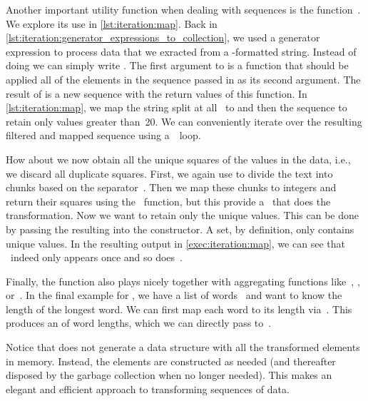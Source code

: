 %
%
%
Another important utility function when dealing with sequences is the function~.
We explore its use in \cref{lst:iteration:map}.
Back in \cref{lst:iteration:generator_expressions_to_collection}, we used a generator expression to process data that we exracted from a -formatted string.
Instead of doing  we can simply write .
The first argument to  is a function that should be applied all of the elements in the sequence passed in as its second argument.
The result of  is a new sequence with the return values of this function.
In \cref{lst:iteration:map}, we map the string  split at all~ to  and then  the sequence to retain only values greater than~20.
We can conveniently iterate over the resulting filtered and mapped sequence using a~~loop.

How about we now obtain all the unique squares of the values in the  data, i.e., we discard all duplicate squares.
First, we again use  to divide the text into chunks based on the separator~.
Then we map these chunks to integers and return their squares using the ~function, but this provide a~ that does the transformation.
Now we want to retain only the unique values.
This can be done by passing the resulting  into the  constructor.
A set, by definition, only contains unique values.
In the resulting output in \cref{exec:iteration:map}, we can see that ~indeed only appears once and so does~.

Finally, the  function also plays nicely together with aggregating functions like~, , or~.
In the final example for , we have a list of words~ and want to know the length of the longest word.
We can first map each word to its length via~.
This produces an  of word lengths, which we can directly pass to~.

Notice that  does not generate a data structure with all the transformed elements in memory.
Instead, the elements are constructed as needed (and thereafter disposed by the garbage collection when no longer needed).
This makes  an elegant and efficient approach to transforming sequences of data.

